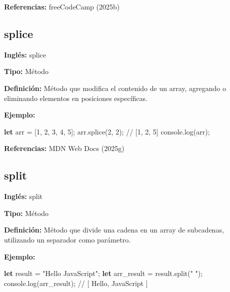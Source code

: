 \documentclass[
  letterpaper,
  DIV=11,
  numbers=noendperiod]{scrreprt}
\newenvironment{Shaded}{\begin{snugshade}}{\end{snugshade}}
\newcommand{\BuiltInTok}[1]{\textcolor[rgb]{0.00,0.23,0.31}{#1}}
\newcommand{\CommentTok}[1]{\textcolor[rgb]{0.37,0.37,0.37}{#1}}
\newcommand{\DecValTok}[1]{\textcolor[rgb]{0.68,0.00,0.00}{#1}}
\newcommand{\FunctionTok}[1]{\textcolor[rgb]{0.28,0.35,0.67}{#1}}
\newcommand{\KeywordTok}[1]{\textcolor[rgb]{0.00,0.23,0.31}{\textbf{#1}}}
\newcommand{\NormalTok}[1]{\textcolor[rgb]{0.00,0.23,0.31}{#1}}
\newcommand{\OperatorTok}[1]{\textcolor[rgb]{0.37,0.37,0.37}{#1}}
\newcommand{\StringTok}[1]{\textcolor[rgb]{0.13,0.47,0.30}{#1}}
\let\oldsubsection\subsection
\renewcommand{\subsection}{\phantomsection\oldsubsection}
\begin{document}
\textbf{Referencias:} freeCodeCamp (2025b)

\subsection*{splice}\label{glos-splice}

\textbf{Inglés:} splice

\textbf{Tipo:} Método

\textbf{Definición:} Método que modifica el contenido de un array,
agregando o eliminando elementos en posiciones específicas.

\textbf{Ejemplo:}

\begin{Shaded}
\begin{Highlighting}[]
\KeywordTok{let}\NormalTok{ arr }\OperatorTok{=}\NormalTok{ [}\DecValTok{1}\OperatorTok{,} \DecValTok{2}\OperatorTok{,} \DecValTok{3}\OperatorTok{,} \DecValTok{4}\OperatorTok{,} \DecValTok{5}\NormalTok{]}\OperatorTok{;}
\NormalTok{arr}\OperatorTok{.}\FunctionTok{splice}\NormalTok{(}\DecValTok{2}\OperatorTok{,} \DecValTok{2}\NormalTok{)}\OperatorTok{;} \CommentTok{// [1, 2, 5]}
\BuiltInTok{console}\OperatorTok{.}\FunctionTok{log}\NormalTok{(arr)}\OperatorTok{;}
\end{Highlighting}
\end{Shaded}

\textbf{Referencias:} MDN Web Docs (2025g)

\subsection*{split}\label{glos-split}

\textbf{Inglés:} split

\textbf{Tipo:} Método

\textbf{Definición:} Método que divide una cadena en un array de
subcadenas, utilizando un separador como parámetro.

\textbf{Ejemplo:}

\begin{Shaded}
\begin{Highlighting}[]
\KeywordTok{let}\NormalTok{ result }\OperatorTok{=} \StringTok{"Hello JavaScript"}\OperatorTok{;}
\KeywordTok{let}\NormalTok{ arr\_result }\OperatorTok{=}\NormalTok{ result}\OperatorTok{.}\FunctionTok{split}\NormalTok{(}\StringTok{" "}\NormalTok{)}\OperatorTok{;}
\BuiltInTok{console}\OperatorTok{.}\FunctionTok{log}\NormalTok{(arr\_result)}\OperatorTok{;}
\CommentTok{// [ \textquotesingle{}Hello\textquotesingle{}, \textquotesingle{}JavaScript\textquotesingle{} ]}
\end{Highlighting}
\end{Shaded}
\end{document}
